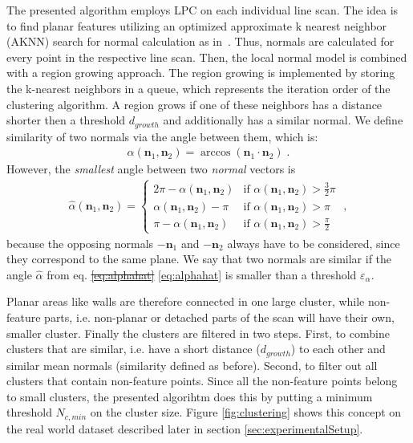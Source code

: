 \documentclass[5p]{elsarticle}
\renewcommand{\vec}[1]{\mathbf{#1}}
\renewcommand{\epsilon}{\varepsilon}
\providecommand{\DIFdeltex}[1]{{\protect\color{red}\sout{#1}}}                      %
\providecommand{\DIFaddbegin}{} %
\providecommand{\DIFaddend}{} %
\providecommand{\DIFdelbegin}{} %
\providecommand{\DIFdelend}{} %
\providecommand{\DIFdel}[1]{\texorpdfstring{\DIFdeltex{#1}}{}} %
\begin{document}
The presented algorithm employs LPC on each individual line scan.
The idea is to find planar features utilizing an optimized approximate k nearest neighbor (AKNN) search for normal calculation as in~\cite{aknnbbs}.
Thus, normals are calculated for every point in the respective line scan.
Then, the local normal model is combined with a region growing approach.
The region growing is implemented by storing the k-nearest neighbors in a queue, which represents the iteration order of the clustering algorithm.
A region grows if one of these neighbors has a distance shorter then a threshold $d_{growth}$ and additionally has a similar normal.
We define similarity of two normals via the angle between them, which is:
\begin{align}
\label{eq:smallestalpha}
	\alpha(\vec{n}_1, \vec{n}_2) = \arccos(\vec{n}_1 \cdot \vec{n}_2) \; .
\end{align}
However, the \textit{smallest} angle between two \textit{normal} vectors is 
\begin{align}
\label{eq:alphahat}
\hat \alpha(\vec{n}_1, \vec{n}_2) = 
\begin{cases}
	2\pi - \alpha(\vec{n}_1, \vec{n}_2) & \text{if  } \alpha(\vec{n}_1, \vec{n}_2) > \frac{3}{2} \pi \\
	\alpha(\vec{n}_1, \vec{n}_2) - \pi & \text{if  } \alpha(\vec{n}_1, \vec{n}_2) > \pi \\
	\pi - \alpha(\vec{n}_1, \vec{n}_2) & \text{if  } \alpha(\vec{n}_1, \vec{n}_2) > \frac{\pi}{2} 
\end{cases}
\; ,
\end{align}
because the opposing normals $-\vec{n}_1$ and $-\vec{n}_2$ always have to be considered, since they correspond to the same plane.
We say that two normals are similar if the angle $\hat \alpha$ from eq. \DIFdelbegin \DIFdel{\ref{eq:alphahat} }\DIFdelend \DIFaddbegin \eqref{eq:alphahat} \DIFaddend is smaller than a threshold $\epsilon_{\alpha}$. 

Planar areas like walls are therefore connected in one large cluster, while non-feature parts, i.e. non-planar or detached parts of the scan will have their own, smaller cluster.
Finally the clusters are filtered in two steps.
First, to combine clusters that are similar, i.e. have a short distance ($d_{growth}$) to each other and similar mean normals (similarity defined as before).
Second, to filter out all clusters that contain non-feature points.
Since all the non-feature points belong to small clusters, the presented algorihtm does this by putting a minimum threshold $N_{c,min}$ on the cluster size.
Figure \ref{fig:clustering} shows this concept on the real world dataset described later in section \ref{sec:experimentalSetup}.
\end{document}
